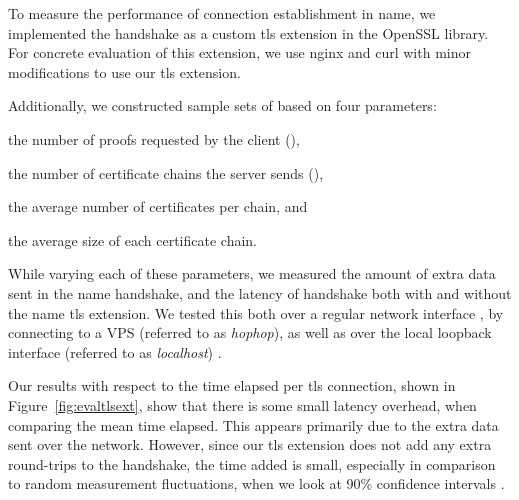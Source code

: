 
To measure the 
performance of connection establishment in \ac{name},
we implemented the handshake as a custom \ac{tls} extension in the
OpenSSL library. For concrete evaluation of this extension, we use
nginx and curl with minor modifications to use our \ac{tls} extension.

Additionally, we constructed sample sets of  based
on four parameters: 
\begin{inparaenum}
\item the number of proofs requested by the client (\numlas),
\item the number of certificate chains the server  sends (\policy),
\item the average number of certificates per chain, and
\item the average size of each certificate chain.
\end{inparaenum}
While varying each of these parameters, we measured the amount of
extra data sent in the \ac{name} handshake, and the latency of
handshake both with and without
the \ac{name} \ac{tls} extension. We
tested this both over a regular network interface
, by connecting to a
VPS  (referred to as \emph{hophop}), as well as over the local loopback
interface (referred to as \emph{localhost}) .

Our results with respect to the time elapsed per \ac{tls} connection,
shown in Figure~\ref{fig:evaltlsext}, show that there is some
small
latency overhead, when comparing the mean time elapsed. This appears
primarily due to
the extra data
sent over the network. However, since
our \ac{tls} extension does not add any extra round-trips to the
handshake, the time added is small, especially in comparison to random
measurement fluctuations, when we look at 90\% confidence intervals
.

